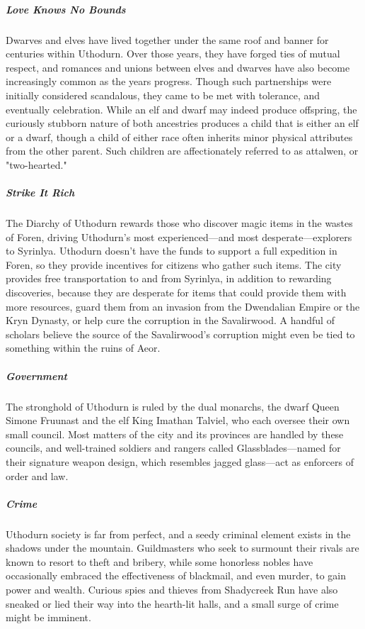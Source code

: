 \documentclass[10pt,a4paper,twoside,bg=print,twocolumn,openany,nodeprecatedcode]{dndbook}
\begin{document}
\subparagraph{Love Knows No Bounds}
Dwarves and elves have lived together under the same roof and banner for centuries within Uthodurn. Over those years, they have forged ties of mutual respect, and romances and unions between elves and dwarves have also become increasingly common as the years progress. Though such partnerships were initially considered scandalous, they came to be met with tolerance, and eventually celebration. While an elf and dwarf may indeed produce offspring, the curiously stubborn nature of both ancestries produces a child that is either an elf or a dwarf, though a child of either race often inherits minor physical attributes from the other parent. Such children are affectionately referred to as attalwen, or "two-hearted."

\subparagraph{Strike It Rich}
The Diarchy of Uthodurn rewards those who discover magic items in the wastes of Foren, driving Uthodurn's most experienced—and most desperate—explorers to Syrinlya. Uthodurn doesn't have the funds to support a full expedition in Foren, so they provide incentives for citizens who gather such items. The city provides free transportation to and from Syrinlya, in addition to rewarding discoveries, because they are desperate for items that could provide them with more resources, guard them from an invasion from the Dwendalian Empire or the Kryn Dynasty, or help cure the corruption in the Savalirwood. A handful of scholars believe the source of the Savalirwood's corruption might even be tied to something within the ruins of Aeor.

\subparagraph{Government}
The stronghold of Uthodurn is ruled by the dual monarchs, the dwarf Queen Simone Fruunast and the elf King Imathan Talviel, who each oversee their own small council. Most matters of the city and its provinces are handled by these councils, and well-trained soldiers and rangers called Glassblades—named for their signature weapon design, which resembles jagged glass—act as enforcers of order and law.

\subparagraph{Crime}
Uthodurn society is far from perfect, and a seedy criminal element exists in the shadows under the mountain. Guildmasters who seek to surmount their rivals are known to resort to theft and bribery, while some honorless nobles have occasionally embraced the effectiveness of blackmail, and even murder, to gain power and wealth. Curious spies and thieves from Shadycreek Run have also sneaked or lied their way into the hearth-lit halls, and a small surge of crime might be imminent.
\end{document}
